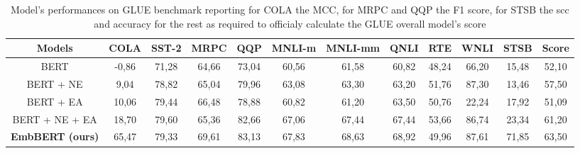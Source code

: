 \begin{table*}[htbp]
    \caption{Model's performances on GLUE benchmark reporting for COLA the MCC, for MRPC and QQP the F1 score, for STSB the \gls{scc} and accuracy for the rest as required to officialy calculate the GLUE overall model's score}
    \begin{center}
    
        \begin{tabular}{| c | c c c c c c c c c c | c |}
        \hline
        \textbf{Models}     & COLA      & SST-2     & MRPC      & QQP       & MNLI-m    & MNLI-mm   & QNLI      & RTE       & WNLI      & STSB      & Score \\
        \hline
        BERT                & -0,86     & 71,28     & 64,66     & 73,04     & 60,56     & 61,58     & 60,82     & 48,24     & 66,20     & 15,48     & 52,10 \\
        \hline
        BERT + NE \cite{NanoBERT}   & 9,04      & 78,82     & 65,04     & 79,96     & 63,08     & 63,30     & 63,20     & 51,76     & 87,30     & 13,46     & 57,50 \\            
        \hline
        BERT + EA \cite{efficient_attention}   & 10,06     & 79,44     &  66,48    & 78,88     & 60,82     & 61,20     & 63,50     & 50,76     & 22,24     & 17,92     & 51,09 \\
        \hline
        BERT + NE + EA      & 18,70     & 79,60     & 65,36     & 82,66     & 67,06     & 67,44     & 67,44     & 53,66     & 86,74     & 23,34     & 61,20 \\
        \hline
        \hline
        \textbf{EmbBERT (ours)}    & 65,47 & 79,33 & 69,61 & 83,13 &  67,83 & 68,63 & 68,92 & 49,96 & 87,61 & 71,85 & 63,50    \\
        \hline
        \end{tabular}

    \label{table:res_glue_abl}
    \end{center}

    
    
\end{table*}
